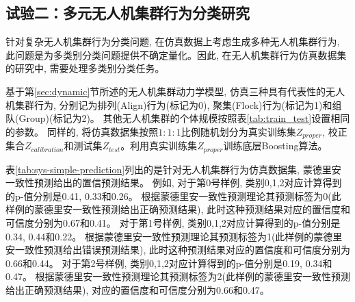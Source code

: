 \subsection{试验二：多元无人机集群行为分类研究}
针对复杂无人机集群行为分类问题, 在仿真数据上考虑生成多种无人机集群行为, 此问题是为多类别分类问题提供不确定量化。因此, 在无人机集群行为仿真数据集的研究中, 需要处理多类别分类任务。

基于第\ref{sec:dynamic}节所述的无人机集群动力学模型, 仿真三种具有代表性的无人机集群行为, 分别记为排列(Align)行为(标记为0), 聚集(Flock)行为(标记为1)和组队(Group)(标记为2)。 其他无人机集群的个体规模按照表\ref{tab:train_test}设置相同的参数。 同样的, 将仿真数据集按照$1:1:1$比例随机划分为真实训练集$Z_{proper}$, 校正集合$Z_{calibration}$和测试集$Z_{test}$。利用真实训练集$Z_{proper}$训练底层Boosting算法。

表\ref{tab:sys-simple-prediction}列出的是针对无人机集群行为仿真数据集, 蒙德里安一致性预测给出的置信预测结果。 例如, 对于第0号样例, 类别0,1,2对应计算得到的p-值分别是0.41, 0.33和0.26。 根据蒙德里安一致性预测理论其预测标签为0(此样例的蒙德里安一致性预测给出正确预测结果), 此时这种预测结果对应的置信度和可信度分别为0.67和0.41。 对于第1号样例, 类别0,1,2对应计算得到的p-值分别是0.34, 0.44和0.22。 根据蒙德里安一致性预测理论其预测标签为1(此样例的蒙德里安一致性预测给出错误预测结果), 此时这种预测结果对应的置信度和可信度分别为0.66和0.44。 对于第2号样例, 类别0,1,2对应计算得到的p-值分别是0.19, 0.34和0.47。 根据蒙德里安一致性预测理论其预测标签为2(此样例的蒙德里安一致性预测给出正确预测结果), 对应的置信度和可信度分别为0.66和0.47。

